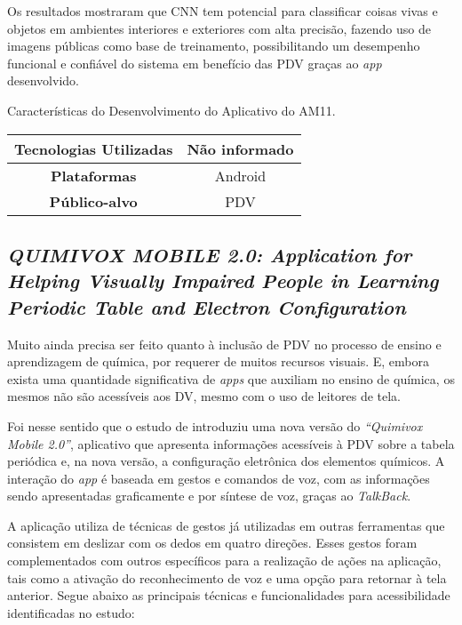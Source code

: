 Os resultados mostraram que CNN tem potencial para classificar coisas vivas e objetos em ambientes interiores e exteriores com alta precisão, fazendo uso de imagens públicas
como base de treinamento, possibilitando um desempenho funcional e confiável do sistema em benefício das PDV graças ao \emph{app} desenvolvido.

\begin{quadro}[htb!]
  \caption{\label{qua-car-am11}Características do Desenvolvimento do Aplicativo do AM11.}
  \begin{tabular}{|c|c|}
    \hline
    \textbf{Tecnologias Utilizadas} & Não informado \\ \hline
    \textbf{Plataformas}            & Android       \\ \hline
    \textbf{Público-alvo}           & PDV           \\
    \hline
  \end{tabular}
\end{quadro}

\newpage

\subsection{\emph{QUIMIVOX MOBILE 2.0: Application for Helping Visually Impaired People in Learning Periodic Table and Electron Configuration}}

Muito ainda precisa ser feito quanto à inclusão de PDV no processo de ensino e aprendizagem de química, por requerer de muitos recursos visuais.
E, embora exista uma quantidade significativa de \emph{apps} que auxiliam no ensino de química, os mesmos não são acessíveis aos DV, mesmo com o uso de leitores de tela.

Foi nesse sentido que o estudo de  introduziu uma nova versão do \emph{``Quimivox Mobile 2.0''},
aplicativo que apresenta informações acessíveis à PDV sobre a tabela periódica e, na nova versão, a configuração eletrônica
dos elementos químicos. A interação do \emph{app} é baseada em gestos e comandos de voz, com as informações sendo apresentadas
graficamente e por síntese de voz, graças ao \emph{TalkBack}.

A aplicação utiliza de técnicas de gestos já utilizadas em outras ferramentas que consistem em deslizar com os dedos em quatro
direções. Esses gestos foram complementados com outros específicos para a realização de ações na aplicação, tais como a ativação
do reconhecimento de voz e uma opção para retornar à tela anterior.
Segue abaixo as principais técnicas e funcionalidades para acessibilidade identificadas no estudo:

